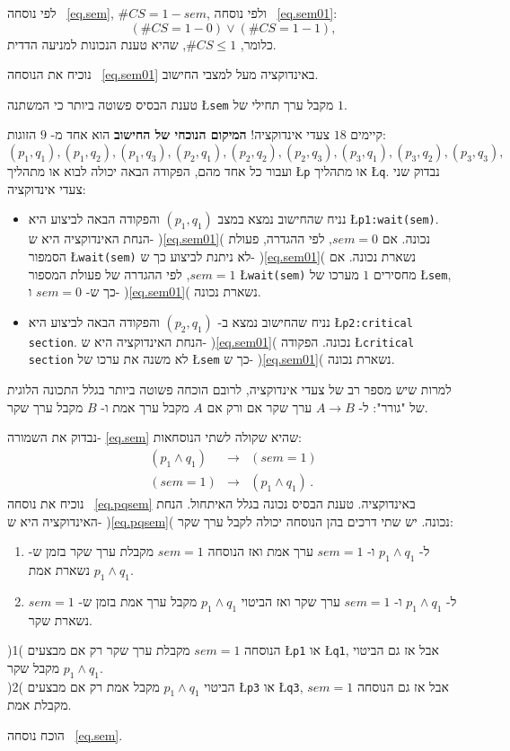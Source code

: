 לפי נוסחה~%
\ref{eq.sem}, $\#\mathit{CS}= 1-\mathit{sem}$,
ולפי נוסחה~%
\ref{eq.sem01}:
\[(\#\mathit{CS}= 1-0) \vee (\#\mathit{CS}= 1-1),\]
כלומר,
$\#\mathit{CS} \leq 1$,
שהיא טענת הנכונות למניעה הדדית.

נוכיח את הנוסחה~%
\ref{eq.sem01}
באינדוקציה מעל למצבי החישוב.

טענת הבסיס פשוטה ביותר כי המשתנה
\L{\texttt{sem}}
מקבל ערך תחילי של
$1$.

קיימים
$18$
צעדי אינדוקציה!
\textbf{המיקום הנוכחי של החישוב}
הוא אחד מ-%
$9$
הזוגות:
\[(p_1,q_1), (p_1,q_2), (p_1,q_3), (p_2,q_1), (p_2,q_2), (p_2,q_3), (p_3,q_1), (p_3,q_2), (p_3,q_3),\]
ועבור כל אחד מהם, הפקודה הבאה יכולה לבוא או מתהליך
\L{\texttt{p}}
או מתהליך
\L{\texttt{q}}.
נבדוק שני צעדי אינדוקציה:

\begin{itemize}
\item
נניח שהחישוב נמצא במצב
$(p_1,q_1)$
והפקודה הבאה לביצוע היא
\L{\texttt{p1:wait(sem)}}.
הנחת האינדוקציה היא ש-%
)\ref{eq.sem01}(
נכונה. אם
$\mathit{sem} = 0$,
לפי ההגדרה, פעולת הסמפור
\L{\texttt{wait(sem)}}
לא ניתנת לביצוע כך ש-%
)\ref{eq.sem01}(
נשארת נכונה. אם
$\mathit{sem} = 1$,
לפי ההגדרה של פעולת המספור
\L{\texttt{wait(sem)}}
מחסירים
$1$
מערכו של
\L{\texttt{sem}},
כך ש-%
$\mathit{sem} = 0$
ו-%
)\ref{eq.sem01}(
נשארת נכונה.
\item
נניח שהחישוב נמצא ב-%
$(p_2,q_1)$
והפקודה הבאה לביצוע היא
\L{\texttt{p2:critical section}}.
הנחת האינדוקציה היא ש-%
)\ref{eq.sem01}(
נכונה. הפקודה
\L{\texttt{critical section}}
לא משנה את ערכו של
\L{\texttt{sem}}
כך ש-%
)\ref{eq.sem01}(
נשארת נכונה.
\end{itemize}
למרות שיש מספר רב של צעדי אינדוקציה, לרובם הוכחה פשוטה ביותר בגלל התכונה הלוגית של "גורר": ל-%
$A\rightarrow B$
ערך שקר אם ורק אם
$A$
מקבל ערך אמת ו-%
$B$
מקבל ערך שקר.

נבדוק את השמורה-%
\ref{eq.sem}
שהיא שקולה לשתי הנוסחאות:
\begin{eqnarray}
(p_1 \wedge q_1) &\rightarrow& (\mathit{sem} = 1)\label{eq.pqsem}\\
(\mathit{sem} = 1) &\rightarrow& (p_1 \wedge q_1)\label{eq.sempq}\,.
\end{eqnarray}
נוכיח את נוסחה~%
\ref{eq.pqsem}
באינדוקציה. טענת הבסיס נכונה בגלל האיתחול. הנחת האינדוקציה היא ש-%
)\ref{eq.pqsem}(
נכונה. יש שתי דרכים בהן הנוסחה יכולה לקבל ערך שקר:
\begin{enumerate}
\item
ל-%
$p_1 \wedge q_1$
ו-%
$\mathit{sem} = 1$
ערך אמת ואז הנוסחה
$\mathit{sem} = 1$
מקבלת ערך שקר בזמן ש-%
$p_1 \wedge q_1$
נשארת אמת.
\item
ל-%
$p_1 \wedge q_1$
ו-%
$\mathit{sem} = 1$
ערך שקר ואז הביטוי
$p_1 \wedge q_1$
מקבל ערך אמת בזמן ש-%
$\mathit{sem} = 1$
נשארת שקר.
\end{enumerate}
)1( הנוסחה 
$\mathit{sem} = 1$
מקבלת ערך שקר רק אם מבצעים
\L{\texttt{p1}}
או
\L{\texttt{q1}},
אבל אז גם הביטוי
$p_1 \wedge q_1$
מקבל שקר.\\
)2( הביטוי
$p_1 \wedge q_1$
מקבל אמת רק אם מבצעים
\L{\texttt{p3}}
או
\L{\texttt{q3}},
אבל אז גם הנוסחה
$\mathit{sem} = 1$
מקבלת אמת.

\begin{exercise}
הוכח נוסחה
~\ref{eq.sem}.
\end{exercise}


